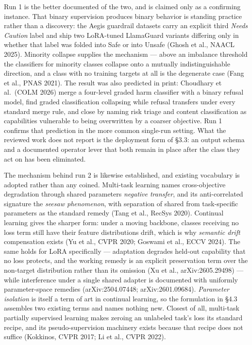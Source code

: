 \documentclass[10pt]{article}
\begin{document}
Run 1 is the better documented of the two, and is claimed only as a confirming instance.
That binary supervision produces binary behavior is standing practice rather than a discovery: the
Aegis guardrail datasets carry an explicit third \emph{Needs Caution} label and ship two LoRA-tuned
LlamaGuard variants differing only in whether that label was folded into Safe or into Unsafe (Ghosh
et al., NAACL 2025). Minority collapse supplies the mechanism --- above an imbalance threshold the
classifiers for minority classes collapse onto a mutually indistinguishable direction, and a class
with no training targets at all is the degenerate case (Fang et al., PNAS 2021). The result was also
predicted in print: Choudhary et al.~(COLM 2026) merge a four-level graded harm classifier with a
binary refusal model, find graded classification collapsing while refusal transfers under every
standard merge rule, and close by naming risk triage and content classification as capabilities
vulnerable to being overwritten by a coarser objective. Run 1 confirms that prediction in the more
common single-run setting. What the reviewed work does not report is the deployment form of §3.3: an
output schema and a documented operator lever that both remain in place after the class they act on
has been eliminated.

The mechanism behind run 2 is likewise established, and existing vocabulary is adopted rather than
any coined. Multi-task learning names cross-objective degradation through shared
parameters \emph{negative transfer}, and its anti-correlated signature the \emph{seesaw phenomenon}, with
separation of shared from task-specific parameters as the standard remedy (Tang et al., RecSys 2020).
Continual learning gives the sharper form: under a moving backbone, classes receiving no loss term
still have their feature distributions drift, which is why \emph{semantic drift} compensation exists (Yu
et al., CVPR 2020; Goswami et al., ECCV 2024). The same holds for LoRA specifically --- adaptation
degrades held-out capability that no loss protects, and the working remedy is an explicit
preservation term over the non-target distribution rather than its omission (Xu et al.,
arXiv:2605.29498) --- while interference under a single shared adapter is documented with uniformly
parameter-space remedies (arXiv:2504.07448; arXiv:2601.09684). \emph{Parameter isolation} is itself a term
of art in continual learning, so the formulation in §4.3 assembles two existing terms and names
nothing new. Closest of all, multi-task partially supervised learning makes zeroing an unlabeled
task's loss its standard recipe, and its pseudo-supervision machinery exists because that recipe does
not suffice (Kokkinos, CVPR 2017; Li et al., CVPR 2022).
\end{document}
